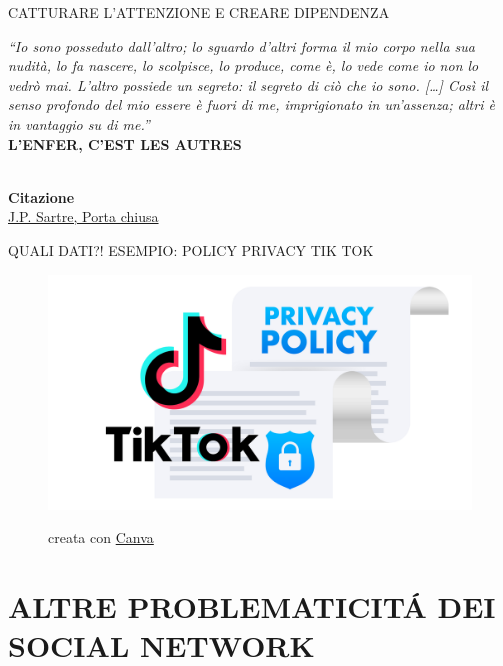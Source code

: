 \documentclass[aspectratio=1610]{beamer}
\begin{document}
\begin{frame}{CATTURARE L'ATTENZIONE E CREARE DIPENDENZA}
    \begin{minipage}{0.98\linewidth}
        \centering
        \Large
        \textit{``Io sono posseduto dall’altro; lo sguardo d’altri forma il mio corpo 
        nella sua nudità, lo fa nascere, lo scolpisce, lo produce, come è, 
        lo vede come io non lo vedrò mai. L’altro possiede un segreto: il segreto di ciò 
        che io sono. […] Così il senso profondo del mio essere è fuori di me, imprigionato 
        in un’assenza; altri è in vantaggio su di me.''}\\
        \bigskip
        \textbf{L'ENFER, C'EST LES AUTRES}
    \end{minipage}\\
    \bigskip
    \tiny{\textbf{Citazione}}\\
    \tiny{\href{https://arenaphilosophika.it/linferno-sono-gli-altri/}{J.P. Sartre, Porta chiusa}}
\end{frame}

\begin{frame}{QUALI DATI?! ESEMPIO: POLICY PRIVACY TIK TOK}
    \begin{figure}
        \href{https://www.tiktok.com/legal/page/eea/privacy-policy/it}{\includegraphics[width=\linewidth]{img/tiktok_2.png}}
        \caption{{creata con \href{https://www.canva.com}{Canva}}}
    \end{figure}
\end{frame}

\section{ALTRE PROBLEMATICIT\'A DEI SOCIAL NETWORK}
\end{document}
